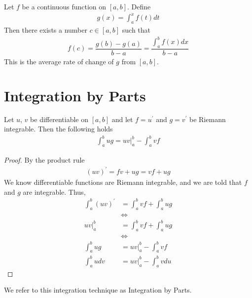 \begin{theorem}
Let $f$ be a continuous function on $[a, b]$. Define
\begin{align*}
    g(x) = \int_{a}^{x} f(t) dt
\end{align*}
Then there exists a number $c \in [a, b]$ such that
\begin{align*}
    f(c) = \dfrac{g(b) - g(a)}{b - a} = \dfrac{\int_{a}^{b} f(x) dx}{b - a}
\end{align*}
This is the average rate of change of $g$ from $[a, b]$.
\end{theorem}

\newpage
\section{Integration by Parts}

\begin{theorem}
Let $u$, $v$ be differentiable on $[a, b]$ and let $f = u^{'}$ and $g = v^{'}$ be Riemann integrable. Then the following holds
\begin{align*}
    \int_{a}^{b} ug = uv \Big|_{a}^{b} - \int_{a}^{b} vf
\end{align*}
\begin{proof}
By the product rule
\begin{align*}
    (uv)^{'} = fv + ug = vf + ug
\end{align*}
We know differentiable functions are Riemann integrable, and we are told that $f$ and $g$ are integrable. Thus,
\begin{align*}
    \int_{a}^{b} (uv)^{'} &= \int_{a}^{b} vf + \int_{a}^{b} ug\\[2ex]
    &\Longleftrightarrow\\[2ex]
    uv \Big|_{a}^{b} &= \int_{a}^{b} vf + \int_{a}^{b} ug\\[2ex] 
    &\Longleftrightarrow\\[2ex]
    \int_{a}^{b} ug &= uv \Big|_{a}^{b} - \int_{a}^{b} vf\\[2ex]
    \int_{a}^{b} u dv &= uv \Big|_{a}^{b} - \int_{a}^{b} v du
\end{align*}
\end{proof}
We refer to this integration technique as Integration by Parts.
\end{theorem}


